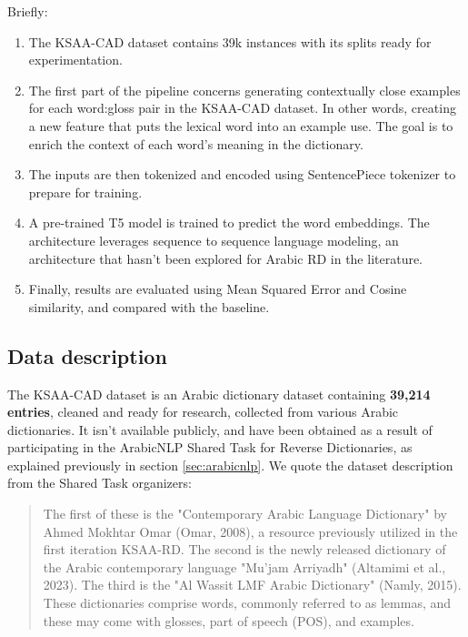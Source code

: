 \documentclass[12pt]{article}
\begin{document}
Briefly:
\begin{enumerate}
    \item The KSAA-CAD dataset contains 39k instances with its splits ready for experimentation.
    \item The first part of the pipeline concerns generating contextually close examples for each word:gloss pair in the KSAA-CAD dataset. In other words, creating a new feature that puts the lexical word into an example use. The goal is to enrich the context of each word's meaning in the dictionary.
    \item The inputs are then tokenized and encoded using SentencePiece tokenizer to prepare for training.
    \item A pre-trained T5 model \cite{Linting2021} is trained to predict the word embeddings. The architecture leverages sequence to sequence language modeling, an architecture that hasn’t been explored for Arabic RD in the literature.
    \item Finally, results are evaluated using Mean Squared Error and Cosine similarity, and compared with the baseline.
\end{enumerate}


\subsection{Data description}

The KSAA-CAD dataset is an Arabic dictionary dataset containing \textbf{39,214 entries}, cleaned and ready for research, collected from various Arabic dictionaries. It isn't available publicly, and have been obtained as a result of participating in the ArabicNLP Shared Task for Reverse Dictionaries, as explained previously in section \ref{sec:arabicnlp}. We quote the dataset description from the Shared Task organizers:

\begin{quote}
    The first of these is the "Contemporary Arabic Language Dictionary" by Ahmed Mokhtar Omar (Omar, 2008), a resource previously utilized in the first iteration KSAA-RD. The second is the newly released dictionary of the Arabic contemporary language "Mu'jam Arriyadh" (Altamimi et al., 2023). The third is the "Al Wassit LMF Arabic Dictionary" (Namly, 2015). These dictionaries comprise words, commonly referred to as lemmas, and these may come with glosses, part of speech (POS), and examples.
\end{quote}
\end{document}

